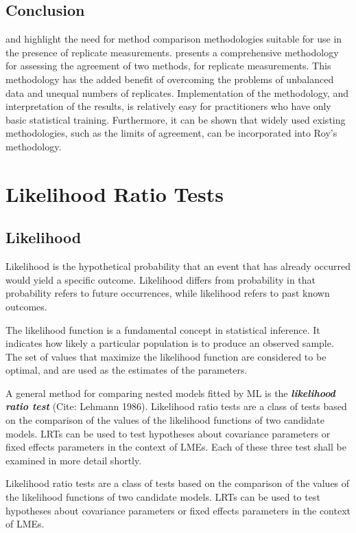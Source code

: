 \documentclass[12pt, a4paper]{report}
\theoremstyle{plain}
\theoremstyle{definition}
\theoremstyle{remark}
\begin{document}

\section{Conclusion}
\citet{BXC2008} and \citet{roy} highlight the need for method comparison methodologies suitable for use in the presence of replicate measurements. \citet{roy} presents a comprehensive methodology for assessing the agreement of two methods, for replicate measurements. This methodology has the added benefit of overcoming the problems of unbalanced data and unequal numbers of replicates. Implementation of the methodology, and interpretation of the results, is relatively easy for practitioners who have only basic statistical training. Furthermore, it can be shown that widely used existing methodologies, such as the limits of agreement, can be incorporated into Roy's methodology.


\chapter{Likelihood Ratio Tests}
\section{Likelihood}
Likelihood is the hypothetical probability that an event that has
already occurred would yield a specific outcome. Likelihood
differs from probability in that probability refers to future
occurrences, while likelihood refers to past known outcomes.

The likelihood function is a fundamental concept in statistical inference. It indicates how likely a particular population is to produce an observed sample. The set of values that maximize the likelihood function are considered to be optimal, and are used as the estimates of the parameters.


A general method for comparing nested models fitted by ML is the \textbf{\emph{likelihood ratio test}} (Cite: Lehmann 1986).  Likelihood ratio tests are a class of tests based on the comparison of the values of the likelihood functions of two candidate models. LRTs can be used to test hypotheses about covariance parameters or fixed effects parameters in the context of LMEs.  Each of these three test shall be examined in more detail shortly.

Likelihood ratio tests are a class of tests based on the
comparison of the values of the likelihood functions of two
candidate models. LRTs can be used to test hypotheses about
covariance parameters or fixed effects parameters in the context
of LMEs.
\end{document}
